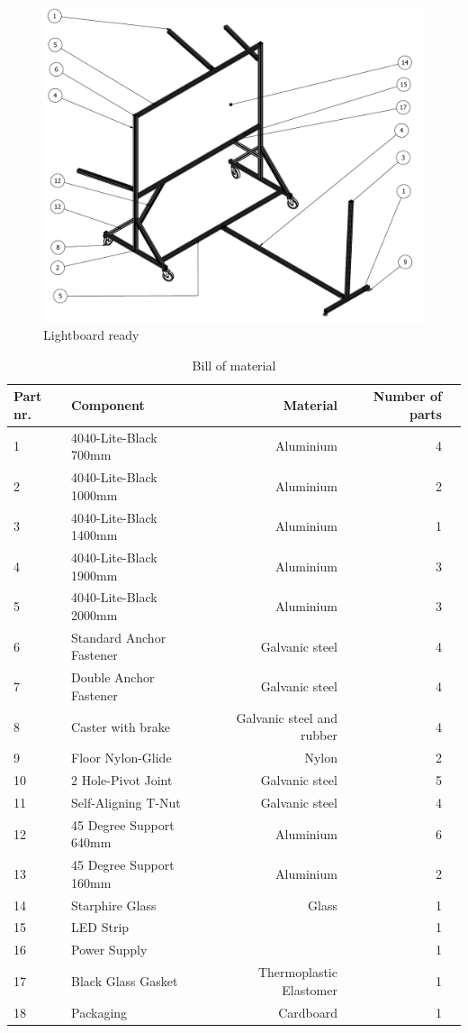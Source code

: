 \documentclass[a4paper]{jpconf}
\begin{document}

\begin{figure}
	\centering
	\includegraphics[width=1\linewidth]{frame1.pdf}
	\caption{Lightboard ready}
	\label{fig:Finalprodotype}
\end{figure}

\begin{table}[]
	\centering
	\begin{tabular}{llrrr}
		
		Part nr. & Component & Material & Number of parts  \\
		\hline
		1&4040-Lite-Black 700mm  & Aluminium  & 4  \\
		2&4040-Lite-Black 1000mm & Aluminium &  2\\
		3&4040-Lite-Black 1400mm & Aluminium & 1  \\
		4&4040-Lite-Black 1900mm & Aluminium & 3  \\
		5&4040-Lite-Black 2000mm  & Aluminium &3  \\
		6&Standard Anchor Fastener  & Galvanic steel&4  \\
		7&Double Anchor Fastener  &Galvanic steel & 4  \\
		8&Caster with brake  & Galvanic steel and rubber & 4  \\
		9&Floor Nylon-Glide  & Nylon& 2 \\
		10&2 Hole-Pivot Joint  & Galvanic steel & 5  \\
		11&Self-Aligning T-Nut  & Galvanic steel &4   \\
		12&45 Degree Support 640mm  & Aluminium &  6 \\
		13&45 Degree Support 160mm  & Aluminium & 2  \\
		14&Starphire Glass& Glass &1\\
		15&LED Strip& & 1\\
		16&Power Supply & & 1 \\
		17&Black Glass Gasket & Thermoplastic Elastomer & 1\\
		18&Packaging & Cardboard & 1  \\ %
	\end{tabular}
	\caption{Bill of material }
	\label{tab:BOM}
\end{table}
\end{document}
